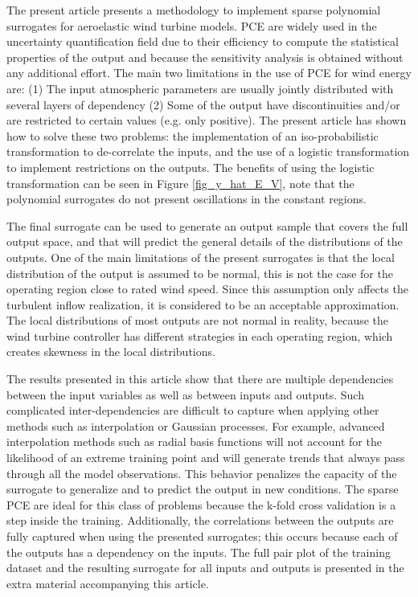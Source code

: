 \documentclass[preprint,12pt]{elsarticle}
\begin{document}
The present article presents a methodology to implement sparse polynomial surrogates for aeroelastic wind turbine models. PCE are widely used in the uncertainty quantification field due to their efficiency to compute the statistical properties of the output and because the sensitivity analysis is obtained without any additional effort. The main two limitations in the use of PCE for wind energy are: (1) The input atmospheric parameters are usually jointly distributed with several layers of dependency (2) Some of the output have discontinuities and/or are restricted to certain values (e.g. only positive). The present article has shown how to solve these two problems: the implementation of an iso-probabilistic transformation to de-correlate the inputs, and  the use of a logistic transformation to implement restrictions on the outputs. The benefits of using the logistic transformation can be seen in Figure \ref{fig_y_hat_E_V}, note that the polynomial surrogates do not present oscillations in the constant regions.

The final surrogate can be used to generate an output sample that covers the full output space, and that will predict the general details of the distributions of the outputs. One of the main limitations of the present surrogates is that the local distribution of the output is assumed to be normal, this is not the case for the operating region close to rated wind speed. Since this assumption only affects the turbulent inflow realization, it is considered to be an acceptable approximation. The local distributions of most outputs are not normal in reality, because the wind turbine controller has different strategies in each operating region, which creates skewness in the local distributions.

The results presented in this article show that there are multiple dependencies between the input variables as well as between inputs and outputs. Such complicated inter-dependencies are difficult to capture when applying other methods such as interpolation or Gaussian processes. For example, advanced interpolation methods such as radial basis functions will not account for the likelihood of an extreme training point and will generate trends that always pass through all the model observations. This behavior penalizes the capacity of the surrogate to generalize and to predict the output in new conditions. The sparse PCE are ideal for this class of problems because the k-fold cross validation is a step inside the training. Additionally, the correlations between the outputs are fully captured when using the presented surrogates; this occurs because each of the outputs has a dependency on the inputs. The full pair plot of the training dataset and the resulting surrogate for all inputs and outputs is presented in the extra material accompanying this article. %
\end{document}
